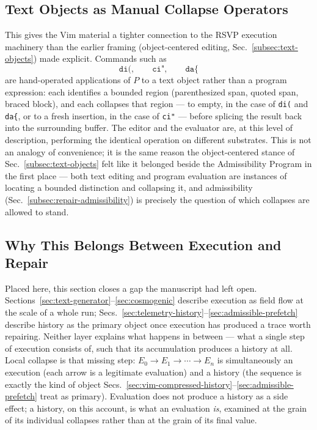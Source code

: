 \documentclass[12pt,a4paper]{article}
\theoremstyle{plain}
\theoremstyle{definition}
\theoremstyle{remark}
\begin{document}
\subsection{Text Objects as Manual Collapse Operators}
\label{subsec:text-objects-as-collapse}

This gives the Vim material a tighter connection to the RSVP execution machinery than the earlier framing (object-centered editing, Sec.~\ref{subsec:text-objects}) made explicit. Commands such as
\[
\texttt{di(}, \qquad \texttt{ci"}, \qquad \texttt{da\{}
\]
are hand-operated applications of $P$ to a text object rather than a program expression: each identifies a bounded region (parenthesized span, quoted span, braced block), and each collapses that region — to empty, in the case of \texttt{di(} and \texttt{da\{}, or to a fresh insertion, in the case of \texttt{ci"} — before splicing the result back into the surrounding buffer. The editor and the evaluator are, at this level of description, performing the identical operation on different substrates. This is not an analogy of convenience; it is the same reason the object-centered stance of Sec.~\ref{subsec:text-objects} felt like it belonged beside the Admissibility Program in the first place — both text editing and program evaluation are instances of locating a bounded distinction and collapsing it, and admissibility (Sec.~\ref{subsec:repair-admissibility}) is precisely the question of which collapses are allowed to stand.

\subsection{Why This Belongs Between Execution and Repair}
\label{subsec:collapse-bridge}

Placed here, this section closes a gap the manuscript had left open. Sections~\ref{sec:text-generator}–\ref{sec:cosmogenic} describe execution as field flow at the scale of a whole run; Secs.~\ref{sec:telemetry-history}–\ref{sec:admissible-prefetch} describe history as the primary object once execution has produced a trace worth repairing. Neither layer explains what happens in between — what a single step of execution consists of, such that its accumulation produces a history at all. Local collapse is that missing step: $E_0 \to E_1 \to \cdots \to E_n$ is simultaneously an execution (each arrow is a legitimate evaluation) and a history (the sequence is exactly the kind of object Secs.~\ref{sec:vim-compressed-history}–\ref{sec:admissible-prefetch} treat as primary). Evaluation does not produce a history as a side effect; a history, on this account, is what an evaluation \emph{is}, examined at the grain of its individual collapses rather than at the grain of its final value.
\end{document}
